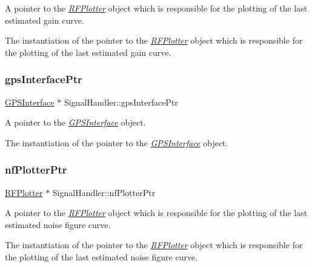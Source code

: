 A pointer to the {\itshape \hyperlink{classRFPlotter}{R\+F\+Plotter}} object which is responsible for the plotting of the last estimated gain curve. 

The instantiation of the pointer to the {\itshape \hyperlink{classRFPlotter}{R\+F\+Plotter}} object which is responsible for the plotting of the last estimated gain curve. \mbox{\label{classSignalHandler_ac6bc3decceefdff9d3e5c15e4125fe08}} 
\subsubsection{\texorpdfstring{gps\+Interface\+Ptr}{gpsInterfacePtr}}
{\footnotesize\ttfamily \hyperlink{classGPSInterface}{G\+P\+S\+Interface} $\ast$ Signal\+Handler\+::gps\+Interface\+Ptr\hspace{0.3cm}{\ttfamily [static]}}



A pointer to the {\itshape \hyperlink{classGPSInterface}{G\+P\+S\+Interface}} object. 

The instantiation of the pointer to the {\itshape \hyperlink{classGPSInterface}{G\+P\+S\+Interface}} object. \mbox{\label{classSignalHandler_ad5f57e0f7a4ca52357bdd00c358d3a3a}} 
\subsubsection{\texorpdfstring{nf\+Plotter\+Ptr}{nfPlotterPtr}}
{\footnotesize\ttfamily \hyperlink{classRFPlotter}{R\+F\+Plotter} $\ast$ Signal\+Handler\+::nf\+Plotter\+Ptr\hspace{0.3cm}{\ttfamily [static]}}



A pointer to the {\itshape \hyperlink{classRFPlotter}{R\+F\+Plotter}} object which is responsible for the plotting of the last estimated noise figure curve. 

The instantiation of the pointer to the {\itshape \hyperlink{classRFPlotter}{R\+F\+Plotter}} object which is responsible for the plotting of the last estimated noise figure curve. \mbox{\label{classSignalHandler_a9ce3533694e1e412496dc5a9b339ccc3}} 
